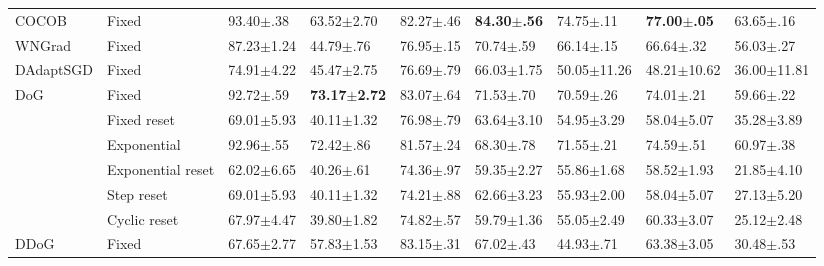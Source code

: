 \begin{tabular}{lllllllll}
    COCOB                    & Fixed             & 93.40$\pm$.38           & 63.52$\pm$2.70           & 82.27$\pm$.46           & \bfseries 84.30$\pm$.56 & 74.75$\pm$.11           & \bfseries 77.00$\pm$.05 & 63.65$\pm$.16           \\
    WNGrad                   & Fixed             & 87.23$\pm$1.24          & 44.79$\pm$.76            & 76.95$\pm$.15           & 70.74$\pm$.59           & 66.14$\pm$.15           & 66.64$\pm$.32           & 56.03$\pm$.27           \\
    DAdaptSGD                & Fixed             & 74.91$\pm$4.22          & 45.47$\pm$2.75           & 76.69$\pm$.79           & 66.03$\pm$1.75          & 50.05$\pm$11.26         & 48.21$\pm$10.62         & 36.00$\pm$11.81         \\
    \multirow[c]{6}{*}{DoG}  & Fixed             & 92.72$\pm$.59           & \bfseries 73.17$\pm$2.72 & 83.07$\pm$.64           & 71.53$\pm$.70           & 70.59$\pm$.26           & 74.01$\pm$.21           & 59.66$\pm$.22           \\
                             & Fixed reset       & 69.01$\pm$5.93          & 40.11$\pm$1.32           & 76.98$\pm$.79           & 63.64$\pm$3.10          & 54.95$\pm$3.29          & 58.04$\pm$5.07          & 35.28$\pm$3.89          \\
                             & Exponential       & 92.96$\pm$.55           & 72.42$\pm$.86            & 81.57$\pm$.24           & 68.30$\pm$.78           & 71.55$\pm$.21           & 74.59$\pm$.51           & 60.97$\pm$.38           \\
                             & Exponential reset & 62.02$\pm$6.65          & 40.26$\pm$.61            & 74.36$\pm$.97           & 59.35$\pm$2.27          & 55.86$\pm$1.68          & 58.52$\pm$1.93          & 21.85$\pm$4.10          \\
                             & Step reset        & 69.01$\pm$5.93          & 40.11$\pm$1.32           & 74.21$\pm$.88           & 62.66$\pm$3.23          & 55.93$\pm$2.00          & 58.04$\pm$5.07          & 27.13$\pm$5.20          \\
                             & Cyclic reset      & 67.97$\pm$4.47          & 39.80$\pm$1.82           & 74.82$\pm$.57           & 59.79$\pm$1.36          & 55.05$\pm$2.49          & 60.33$\pm$3.07          & 25.12$\pm$2.48          \\
    DDoG                     & Fixed             & 67.65$\pm$2.77          & 57.83$\pm$1.53           & 83.15$\pm$.31           & 67.02$\pm$.43           & 44.93$\pm$.71           & 63.38$\pm$3.05          & 30.48$\pm$.53           \\

\end{tabular}
